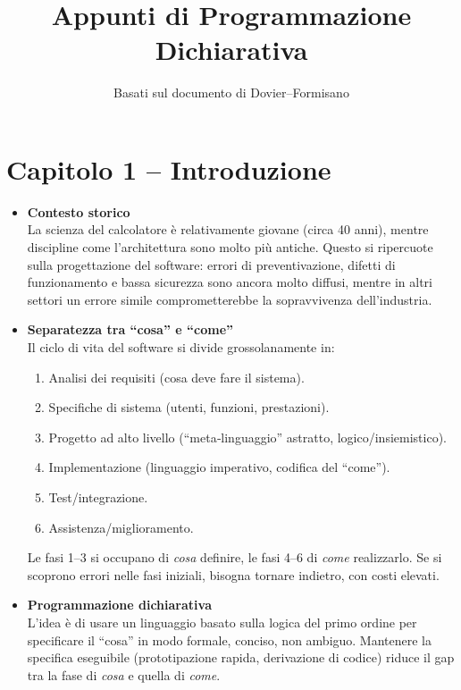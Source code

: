 \documentclass[12pt]{article}
\title{Appunti di Programmazione Dichiarativa}
\author{Basati sul documento di Dovier–Formisano}
\date{}
\begin{document}
\maketitle

\section*{Capitolo 1 – Introduzione}

\begin{itemize}
  \item \textbf{Contesto storico}\\
    La scienza del calcolatore è relativamente giovane (circa 40 anni), mentre discipline come l’architettura sono molto più antiche. Questo si ripercuote sulla progettazione del software: errori di preventivazione, difetti di funzionamento e bassa sicurezza sono ancora molto diffusi, mentre in altri settori un errore simile comprometterebbe la sopravvivenza dell’industria.

  \item \textbf{Separatezza tra “cosa” e “come”}\\
    Il ciclo di vita del software si divide grossolanamente in:
    \begin{enumerate}
      \item Analisi dei requisiti (cosa deve fare il sistema).
      \item Specifiche di sistema (utenti, funzioni, prestazioni).
      \item Progetto ad alto livello (``meta‐linguaggio'' astratto, logico/insiemistico).
      \item Implementazione (linguaggio imperativo, codifica del ``come'').
      \item Test/integrazione.
      \item Assistenza/miglioramento.
    \end{enumerate}
    Le fasi 1--3 si occupano di \emph{cosa} definire, le fasi 4--6 di \emph{come} realizzarlo. Se si scoprono errori nelle fasi iniziali, bisogna tornare indietro, con costi elevati.

  \item \textbf{Programmazione dichiarativa}\\
    L’idea è di usare un linguaggio basato sulla logica del primo ordine per specificare il “cosa” in modo formale, conciso, non ambiguo. Mantenere la specifica eseguibile (prototipazione rapida, derivazione di codice) riduce il gap tra la fase di \emph{cosa} e quella di \emph{come}.


\end{itemize}
\end{document}
